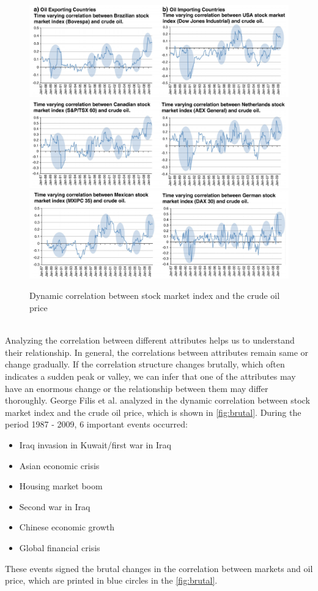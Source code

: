 \begin{figure}[h]
	\centering
	\includegraphics[width=\textwidth]{pictures/motivation21}
	\includegraphics[width=\textwidth]{pictures/motivation22}
	\includegraphics[width=\textwidth]{pictures/motivation23}
	\caption{Dynamic correlation between stock market index and the crude oil price\cite{FILIS2011152}}
	\label{fig:brutal}
\end{figure}\\
Analyzing the correlation between different attributes helps us to understand their relationship. In general, the correlations between attributes remain same or change gradually. If the correlation structure changes brutally, which often indicates a sudden peak or valley, we can infer that one of the attributes may have an enormous change or the relationship between them may differ thoroughly.
George Filis et al. analyzed in \cite{FILIS2011152} the dynamic correlation between stock market index and the crude oil price, which is shown in \autoref{fig:brutal}. During the period 1987 - 2009, 6 important events occurred: 
\begin{itemize}
	\item Iraq invasion in Kuwait/first war in Iraq
	\item Asian economic crisis
	\item Housing market boom
	\item Second war in Iraq
	\item Chinese economic growth
	\item Global financial crisis
\end{itemize}
These events signed the brutal changes in the correlation between markets and oil price, which are printed in blue circles in the \autoref{fig:brutal}.\\

